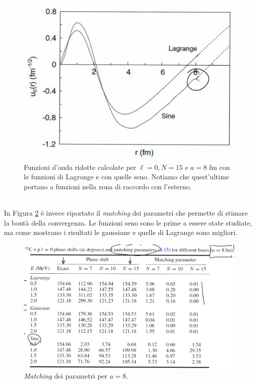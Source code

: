 \begin{figure}[h]
	\centering
	\includegraphics[scale=0.2]{Immagini/0414_metodi2.png}
	\caption{Funzioni d'onda ridotte calcolate per $\ell=0,N=15$ e $a=8$ fm con le funzioni di Lagrange e con quelle seno. Notiamo che quest'ultime portano a funzioni  nella zona di raccordo con l'esterno.}
	\label{0414_p12C-2}
\end{figure}
\\
\noindent In Figura \ref{0414_p12C-3} è invece riportato il \textit{matching} dei parametri che permette di stimare la bontà della convergenza. Le funzioni seno sono le prime a essere state studiate, ma come mostrano i risultati le gaussiane e quelle di Lagrange sono migliori.
\begin{figure}[h]
	\centering
	\includegraphics[scale=0.2]{Immagini/0414_metodi3.png}
	\caption{\textit{Matching} dei parametri per $a=8$.}
	\label{0414_p12C-3}
\end{figure}

